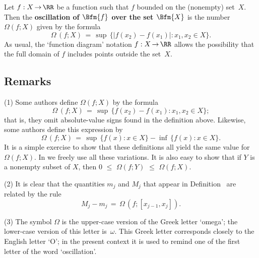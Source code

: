 \V

        Let $f:X \,{\rightarrow}\, {\RR}$ be a function such that $f$ bounded on the (nonempty) set~$X$.
    Then the {\bf oscillation of $\Bfm{f}$ over the set $\Bfm{X}$} is the number ${\Omega}(f;X)$ given by the formula
        \begin{displaymath}
        {\Omega}\,(f;X) \,=\, {\sup}\,\{|f(x_{2})-f(x_{1})|: x_{1},x_{2}{\in}X\}.
        \end{displaymath}
    As usual, the `function diagram' notation $f:X \,{\rightarrow}\, {\RR}$ allows the possibility that the full domain of $f$ includes points outside the set~$X$.

\V

        \subsection{\small{{\bf Remarks}}}
        \label{RemrkH20.50}

\V

        (1) Some authors define ${\Omega}(f;X)$ by the formula
        \begin{displaymath}
        {\Omega}\,(f;X) \,=\, {\sup}\,\{f(x_{2})-f(x_{1}): x_{1},x_{2}{\in}X\};
        \end{displaymath}
    that is, they omit absolute-value signs found in the definition above. Likewise, some authors define this expression by
        \begin{displaymath}
        {\Omega}\,(f;X) \,=\, {\sup}\,\{f(x): x{\in}X\} - {\inf}\,\{f(x): x{\in}X\}.
        \end{displaymath}
    It is a simple exercise to show that these definitions all yield the same value for ${\Omega}(f;X)$. In {\ThisText} we freely use all these variations.
    It is also easy to show that if $Y$ is a nonempty subset of $X$, then $0\,\,{\leq}\,\,{\Omega}(f;Y)\,\,{\leq}\,\,{\Omega}(f;X)$. %

\V

        (2) It is clear that the quantities $m_{j}$ and $M_{j}$ that appear in Definition~ are related by the rule
        \begin{displaymath}
        M_{j} - m_{j} \,=\, {\Omega}\,(f;[x_{j-1},x_{j}]).
        \end{displaymath} 

\V

        (3) The symbol ${\Omega}$ is the upper-case version of the Greek letter `omega'; the lower-case version of this letter is~${\omega}$.
    This Greek letter corresponds closely to the English letter `O'; in the present context it is used to remind one of the first letter of the word `oscillation'.

